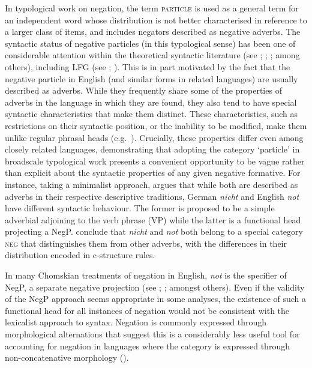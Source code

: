 \documentclass[output=paper,hidelinks]{langscibook}
\begin{document}
In typological work on negation, the term \textsc{particle} is used as a general term for an independent word whose distribution is not better characterised in reference to a larger class of items, and includes negators described as negative adverbs. The syntactic status of negative particles (in this typological sense) has been one of considerable attention within the theoretical syntactic literature (see \citealt {Pollock:89}; \citealt {Haegeman:95}; \citealt {Zanuttini:97}; \citealt{Rowlett:98} among others), including LFG (see \citealt {ButtEtAl1999}; \citealt {przepiorkowski2015two}). This is in part motivated by the fact that the negative particle in English (and similar forms in related languages) are usually described as adverbs. While they frequently share some of the properties of adverbs in the language in which they are found, they also tend to have special syntactic characteristics that make them distinct. These characteristics, such as restrictions on their syntactic position, or the inability to be modified, make them unlike regular phrasal heads (e.g.\ \citealt [141--142] {ButtEtAl1999}). Crucially, these properties differ even among closely related languages, demonstrating that adopting the category `particle' in broadscale typological work presents a convenient opportunity to be vague rather than explicit about the syntactic properties of any given negative formative. For instance, taking a minimalist approach, \citet {Repp:09} argues that while both are described as adverbs in their respective descriptive traditions, German \emph{nicht} and English \emph{not} have different syntactic behaviour. The former is proposed to be a simple adverbial adjoining to the verb phrase (VP) while the latter is a functional head projecting a NegP.  \citet [141--142] {ButtEtAl1999} conclude that \emph{nicht} and \emph{not} both belong to a special category \textsc{neg} that distinguishes them from other adverbs, with the differences in their distribution encoded in c-structure rules.

In many Chomskian treatments of negation in English, \emph{not} is the specifier of NegP, a separate negative projection (see \citealt {Pollock:89}; \citealt {Repp:09}; amongst others). Even if the validity of the NegP approach seems appropriate in some analyses, the existence of such a functional head for all instances of negation would not be consistent with the lexicalist approach to syntax. Negation is commonly expressed through morphological alternations that suggest this is a considerably less useful tool for accounting for negation in languages where the category is expressed through non-concatenative morphology ().
\end{document}
